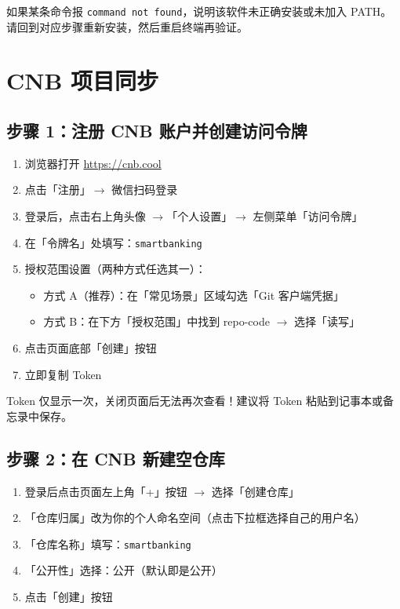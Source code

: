 如果某条命令报 \texttt{command not found}，说明该软件未正确安装或未加入 PATH。请回到对应步骤重新安装，然后重启终端再验证。

\section{CNB 项目同步}

\subsection{步骤 1：注册 CNB 账户并创建访问令牌}

\begin{enumerate}[leftmargin=2em]
  \item 浏览器打开 \url{https://cnb.cool}
  \item 点击「注册」$\rightarrow$ 微信扫码登录
  \item 登录后，点击右上角头像 $\rightarrow$「个人设置」$\rightarrow$ 左侧菜单「访问令牌」
  \item 在「令牌名」处填写：\texttt{smartbanking}
  \item 授权范围设置（两种方式任选其一）：
  \begin{itemize}[leftmargin=1em]
    \item 方式 A（推荐）：在「常见场景」区域勾选「Git 客户端凭据」
    \item 方式 B：在下方「授权范围」中找到 repo-code $\rightarrow$ 选择「读写」
  \end{itemize}
  \item 点击页面底部「创建」按钮
  \item 立即复制 Token
\end{enumerate}

\begin{warningbox}[重要]
Token 仅显示一次，关闭页面后无法再次查看！建议将 Token 粘贴到记事本或备忘录中保存。
\end{warningbox}

\subsection{步骤 2：在 CNB 新建空仓库}

\begin{enumerate}[leftmargin=2em]
  \item 登录后点击页面左上角「+」按钮 $\rightarrow$ 选择「创建仓库」
  \item「仓库归属」改为你的个人命名空间（点击下拉框选择自己的用户名）
  \item「仓库名称」填写：\texttt{smartbanking}
  \item「公开性」选择：公开（默认即是公开）
  \item 点击「创建」按钮
\end{enumerate}

